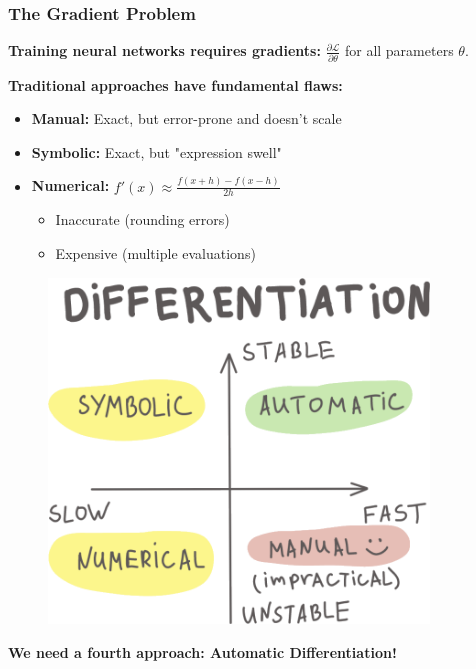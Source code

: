 \documentclass[notes]{beamer}
\begin{document}
\begin{frame}
	\frametitle{The Gradient Problem}
	
	\textbf{Training neural networks requires gradients:} $\frac{\partial \mathcal{L}}{\partial \theta}$ for all parameters $\theta$.
	
	\begin{minipage}[t]{0.48\textwidth}
		\textbf{Traditional approaches have fundamental flaws:}
		\begin{itemize}
			\item \textbf{Manual:} Exact, but error-prone and doesn't scale
			\item \textbf{Symbolic:} Exact, but "expression swell"
			\item \textbf{Numerical:} $f'(x) \approx \frac{f(x+h) - f(x-h)}{2h}$
			\begin{itemize}
				\item Inaccurate (rounding errors)
				\item Expensive (multiple evaluations)
			\end{itemize}
		\end{itemize}
	\end{minipage}
	\hfill
	\begin{minipage}[t]{0.48\textwidth}
		\begin{figure}[ht]
			\centering
			\includegraphics[width=0.9\textwidth]{figs/differentiation.png}
		\end{figure}
	\end{minipage}
	
	
	\textbf{We need a fourth approach: Automatic Differentiation!}
	
\end{frame}
\end{document}
